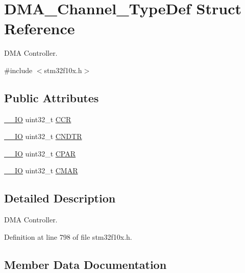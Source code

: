 \hypertarget{struct_d_m_a___channel___type_def}{}\section{D\+M\+A\+\_\+\+Channel\+\_\+\+Type\+Def Struct Reference}
\label{struct_d_m_a___channel___type_def}


D\+MA Controller.  




{\ttfamily \#include $<$stm32f10x.\+h$>$}

\subsection*{Public Attributes}
\begin{DoxyCompactItemize}
\item 
\hyperlink{core__sc300_8h_aec43007d9998a0a0e01faede4133d6be}{\+\_\+\+\_\+\+IO} uint32\+\_\+t \hyperlink{struct_d_m_a___channel___type_def_aa4938d438293f76ff6d9a262715c23eb}{C\+CR}
\item 
\hyperlink{core__sc300_8h_aec43007d9998a0a0e01faede4133d6be}{\+\_\+\+\_\+\+IO} uint32\+\_\+t \hyperlink{struct_d_m_a___channel___type_def_af1c675e412fb96e38b6b4630b88c5676}{C\+N\+D\+TR}
\item 
\hyperlink{core__sc300_8h_aec43007d9998a0a0e01faede4133d6be}{\+\_\+\+\_\+\+IO} uint32\+\_\+t \hyperlink{struct_d_m_a___channel___type_def_a8ce1c9c2742eaaa0e97ddbb3a06154cc}{C\+P\+AR}
\item 
\hyperlink{core__sc300_8h_aec43007d9998a0a0e01faede4133d6be}{\+\_\+\+\_\+\+IO} uint32\+\_\+t \hyperlink{struct_d_m_a___channel___type_def_a7a9886b5f9e0edaf5ced3d1870b33ad7}{C\+M\+AR}
\end{DoxyCompactItemize}


\subsection{Detailed Description}
D\+MA Controller. 

Definition at line 798 of file stm32f10x.\+h.



\subsection{Member Data Documentation}
\mbox{\label{struct_d_m_a___channel___type_def_aa4938d438293f76ff6d9a262715c23eb}} 
